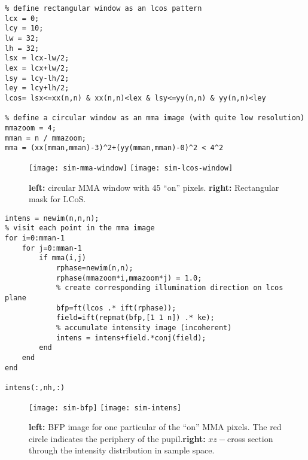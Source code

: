 {\begin{verbatim}
% define rectangular window as an lcos pattern
lcx = 0;
lcy = 10;
lw = 32;
lh = 32;
lsx = lcx-lw/2;
lex = lcx+lw/2;
lsy = lcy-lh/2;
ley = lcy+lh/2;
lcos= lsx<=xx(n,n) & xx(n,n)<lex & lsy<=yy(n,n) & yy(n,n)<ley

% define a circular window as an mma image (with quite low resolution)
mmazoom = 4;
mman = n / mmazoom;
mma = (xx(mman,mman)-3)^2+(yy(mman,mman)-0)^2 < 4^2
\end{verbatim}

\begin{figure}[!hbt]
  \centering
  \texttt{[image: sim-mma-window]}
  \quad\quad
  \texttt{[image: sim-lcos-window]}
  \caption{{\bf left:} circular MMA window with 45 ``on'' pixels. {\bf
      right:} Rectangular mask for LCoS.}
  \label{fig:mma-lcos-window}
\end{figure}


\begin{verbatim}
intens = newim(n,n,n);
% visit each point in the mma image
for i=0:mman-1
    for j=0:mman-1
        if mma(i,j)
            rphase=newim(n,n);
            rphase(mmazoom*i,mmazoom*j) = 1.0;
            % create corresponding illumination direction on lcos plane
            bfp=ft(lcos .* ift(rphase));
            field=ift(repmat(bfp,[1 1 n]) .* ke);
            % accumulate intensity image (incoherent)
            intens = intens+field.*conj(field);
        end
    end
end

intens(:,nh,:)
\end{verbatim}}
\begin{figure}[!hbt]
  \centering
  \texttt{[image: sim-bfp]}
  \quad\quad
  \texttt{[image: sim-intens]}
  \caption{{\bf left:} BFP image for one particular of the ``on'' MMA
    pixels. The red circle indicates the periphery of the pupil.{\bf right:} $xz-$cross section through the intensity
    distribution in sample space.}
  \label{fig:sim-bfp-intens}
\end{figure}
